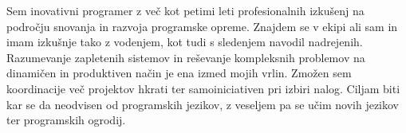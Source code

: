 

\begin{cvparagraph}

Sem inovativni programer z več kot petimi leti profesionalnih izkušenj 
na področju snovanja in razvoja programske opreme.
Znajdem se v ekipi ali sam in imam izkušnje tako z vodenjem, 
kot tudi s sledenjem navodil nadrejenih.
Razumevanje zapletenih sistemov in reševanje kompleksnih problemov 
na dinamičen in produktiven način je ena izmed mojih vrlin.
Zmožen sem koordinacije več projektov hkrati ter samoiniciativen 
pri izbiri nalog.
Ciljam biti kar se da neodvisen od programskih jezikov, 
z veseljem pa se učim novih jezikov ter programskih ogrodij.
\end{cvparagraph}
